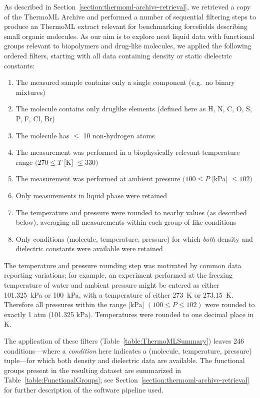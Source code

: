 \documentclass[aip, jcp, reprint]{revtex4-1}  %
\begin{document}
As described in Section~\ref{section:thermoml-archive-retrieval}, we retrieved a copy of the ThermoML Archive and performed a number of sequential filtering steps to produce an ThermoML extract relevant for benchmarking forcefields describing small organic molecules.  
As our aim is to explore neat liquid data with functional groups relevant to biopolymers and drug-like molecules, we applied the following ordered filters, starting with all data containing density or static dielectric constants: 
\begin{enumerate}
 \item The measured sample contains only a single component (e.g.~no binary mixtures)
 \item The molecule contains only druglike elements (defined here as H, N, C, O, S, P, F, Cl, Br)
 \item The molecule has $\le$ 10 non-hydrogen atoms
 \item The measurement was performed in a biophysically relevant temperature range $(270 \le T$ [K] $\le 330)$
 \item The measurement was performed at ambient pressure $(100 \le P$ [kPa]  $\le 102)$
 \item Only measurements in liquid phase were retained
 \item The temperature and pressure were rounded to nearby values (as described below), averaging all measurements within each group of like conditions
 \item Only conditions (molecule, temperature, pressure) for which \emph{both} density and dielectric constants were available were retained
\end{enumerate}
The temperature and pressure rounding step was motivated by common data reporting variations; for example, an experiment performed at the freezing temperature of water and ambient pressure might be entered as either 101.325~kPa or 100~kPa, with a temperature of either 273~K or 273.15~K.  
Therefore all pressures within the range [kPa] $(100 \le P \le 102)$ were rounded to exactly 1 atm (101.325 kPa).  
Temperatures were rounded to one decimal place in K. 

The application of these filters (Table~\ref{table:ThermoMLSummary}) leaves 246 conditions---where a \emph{condition} here indicates a (molecule, temperature, pressure) tuple---for which both density and dielectric data are available.  
The functional groups present in the resulting dataset are summarized in Table~\ref{table:FunctionalGroups}; see Section~\ref{section:thermoml-archive-retrieval} for further description of the software pipeline used.  
\end{document}
